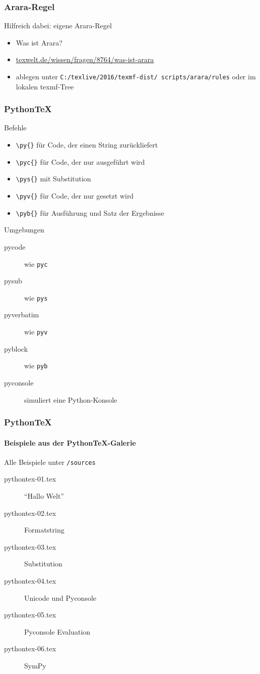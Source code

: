 \documentclass[12pt,ngerman]{beamer}
\begin{document}
\begin{frame}[fragile]
\frametitle{Arara-Regel}

Hilfreich dabei: eigene Arara-Regel

\begin{itemize}
	\item Was ist Arara?
	\item \url{texwelt.de/wissen/fragen/8764/was-ist-arara}
	\item ablegen unter \texttt{C:/texlive/2016/texmf-dist/ scripts/arara/rules} oder im lokalen texmf-Tree
\end{itemize}


\end{frame}

\begin{frame}[fragile]
\frametitle{Python\TeX}

Befehle

\begin{itemize}
\item \verb|\py{}|  für Code, der einen String zurückliefert
\item \verb|\pyc{}|  für Code, der nur ausgeführt wird
\item \verb|\pys{}|  mit Substitution
\item \verb|\pyv{}|  für Code, der nur gesetzt wird
\item \verb|\pyb{}|  für Ausführung und Satz der Ergebnisse
\end{itemize}

Umgebungen

\begin{description}
\item[pycode] wie \texttt{pyc}
\item[pysub] wie \texttt{pys}
\item[pyverbatim] wie \texttt{pyv}
\item[pyblock] wie \texttt{pyb}
\item[pyconsole] simuliert eine Python-Konsole
\end{description}

\end{frame}

\begin{frame}
\frametitle{Python\TeX}
\framesubtitle{Beispiele aus der Python\TeX-Galerie}

Alle Beispiele unter \texttt{/sources}

\begin{description}
\item[pythontex-01.tex] \enquote{Hallo Welt}
\item[pythontex-02.tex] Formatstring
\item[pythontex-03.tex] Substitution
\item[pythontex-04.tex] Unicode und Pyconsole
\item[pythontex-05.tex] Pyconsole Evaluation
\item[pythontex-06.tex] SymPy
\end{description}

\end{frame}
\end{document}
